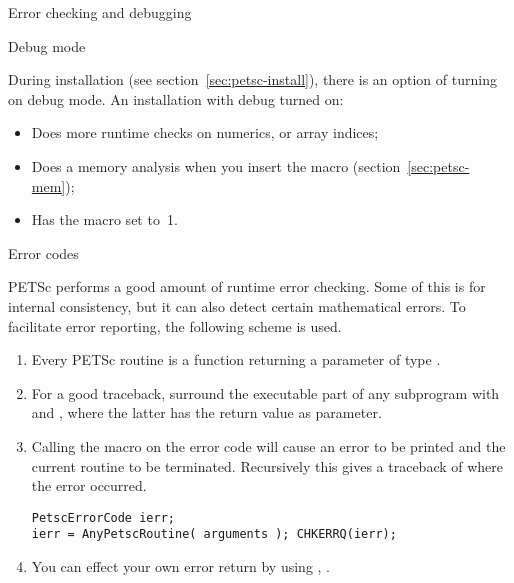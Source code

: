 
 {Error checking and debugging}

 {Debug mode}
\label{sec:petsc-debug-mode}

During installation (see section~\ref{sec:petsc-install}),
there is an option of turning on debug mode.
An installation with debug turned on:
\begin{itemize}
\item Does more runtime checks on numerics, or array indices;
\item Does a memory analysis when you insert the  macro
  (section~\ref{sec:petsc-mem});
\item Has the macro  set to~1.
\end{itemize}

 {Error codes}

PETSc performs a good amount of runtime error checking. Some of this
is for internal consistency, but it can also detect certain
mathematical errors. To facilitate error reporting, the following
scheme is used.
\begin{enumerate}
\item Every PETSc routine is a function returning a parameter of type
  .
\item For a good traceback, surround the executable part of any subprogram
  with  and ,
  where the latter has the return value as parameter.
\item Calling the macro  on the error code will
  cause an error to be printed and the current routine to be
  terminated. Recursively this gives a traceback of where the error
  occurred.
\begin{lstlisting}
PetscErrorCode ierr;
ierr = AnyPetscRoutine( arguments ); CHKERRQ(ierr);
\end{lstlisting}

\item You can effect your own error return by using
  ,
  .
\end{enumerate}

